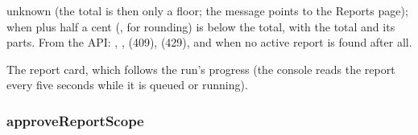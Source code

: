 \begin{description}[style=multiline, leftmargin=19mm, labelwidth=17mm, labelsep=2mm,
  font=\sffamily\bfseries\footnotesize\color{ink}, itemsep=1pt, topsep=2pt, before=\raggedright]
    unknown (the total is then only a floor; the message points to the Reports page);
     when  plus half a cent
    (, for rounding) is below the total, with the total and its parts.
    From the API: , ,  (409),
     (429), and  when no active report is found
    after all.
  \item[Console] The report card, which follows the run's progress (the console reads the
    report every five seconds while it is queued or running).
\end{description}

\subsubsection{approveReportScope}\label{sec:tools:approveReportScope}
